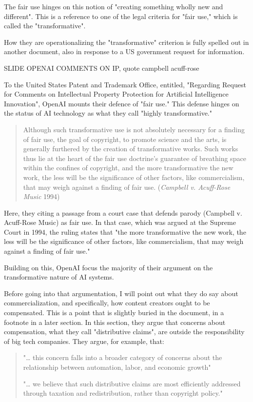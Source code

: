\documentclass[11pt]{article}
\begin{document}
The fair use hinges on this notion of "creating something wholly new
and different". This is a reference to one of the legal criteria for
"fair use," which is called the "transformative".

How they are operationalizing the "transformative" criterion is fully
spelled out in another document, also in response to a US government
request for information.

SLIDE OPENAI COMMENTS ON IP, quote campbell acuff-rose

To the United States Patent and Trademark Office, entitled, "Regarding
Request for Comments on Intellectual Property Protection for
Artificial Intelligence Innovation", OpenAI mounts their defence of
"fair use." This defense hinges on the status of AI technology as what
they call "highly transformative."

\begin{quote}
Although such transformative use is not absolutely necessary for a
finding of fair use, the goal of copyright, to promote science and the
arts, is generally furthered by the creation of transformative works.
Such works thus lie at the heart of the fair use doctrine's guarantee
of breathing space within the confines of copyright, and the more
transformative the new work, the less will be the significance of
other factors, like commercialism, that may weigh against a finding of
fair use. (\emph{Campbell v. Acuff-Rose Music} 1994)
\end{quote}

Here, they citing a passage from a court case that defends parody
(Campbell v. Acuff-Rose Music) as fair use. In that case, which was
argued at the Supreme Court in 1994, the ruling states that "the more
transformative the new work, the less will be the significance of
other factors, like commercialism, that may weigh against a finding of
fair use."

Building on this, OpenAI focus the majority of their argument on the
transformative nature of AI systems.

Before going into that argumentation, I will point out what they do
say about commercialization, and specifically, how content creators
ought to be compensated. This is a point that is slightly buried in
the document, in a footnote in a later section. In this section, they
argue that concerns about compensation, what they call "distributive
claims", are outside the responsibility of big tech companies. They
argue, for example, that:

\begin{quote}
"\ldots{} this concern falls into a broader category of concerns about the
relationship between automation, labor, and economic growth"

"\ldots{} we believe that such distributive claims are most efficiently
addressed through taxation and redistribution, rather than copyright
policy."
\end{quote}
\end{document}
